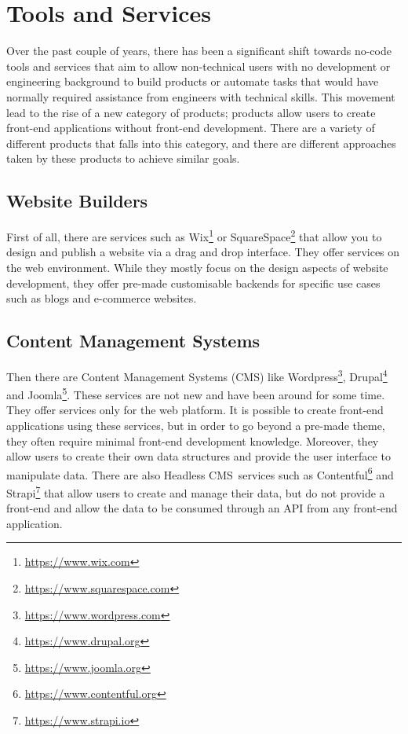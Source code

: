\section{Tools and Services} \label{relatedTools}

Over the past couple of years, there has been a significant shift towards no-code tools and services that aim to allow non-technical users with no development or engineering background to build products or automate tasks that would have normally required assistance from engineers with technical skills. This movement lead to the rise of a new category of products; products allow users to create front-end applications without front-end development. There are a variety of different products that falls into this category, and there are different approaches taken by these products to achieve similar goals.

\subsection{Website Builders}

First of all, there are services such as Wix\footnote{\url{https://www.wix.com}} or SquareSpace\footnote{\url{https://www.squarespace.com}} that allow you to design and publish a website via a drag and drop interface. They offer services on the web environment. While they mostly focus on the design aspects of website development, they offer pre-made customisable backends for specific use cases such as blogs and e-commerce websites.

\subsection{Content Management Systems}

Then there are Content Management Systems (CMS) like Wordpress\footnote{\url{https://www.wordpress.com}}, \mbox{Drupal}\footnote{\url{https://www.drupal.org}} and Joomla\footnote{\url{https://www.joomla.org}}. These services are not new and have been around for some time. They offer services only for the web platform. It is possible to create front-end applications using these services, but in order to go beyond a pre-made theme, they often require minimal front-end development knowledge. Moreover, they allow users to create their own data structures and provide the user interface to manipulate data. There are also Headless CMS~services such as Contentful\footnote{\url{https://www.contentful.org}} and Strapi\footnote{\url{https://www.strapi.io}} that allow users to create and manage their data, but do not provide a front-end and allow the data to be consumed through an API from any front-end application.

